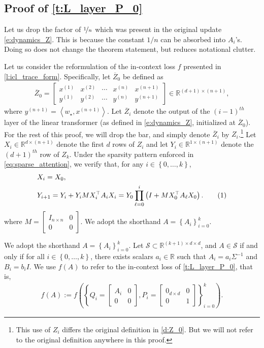 \documentclass{article}
\newcommand{\R}{\mathbb{R}}
\renewcommand{\S}{{\mathcal S}}
\newcommand{\wstar}{w_\star}
\newcommand{\tx}[1]{x^{(#1)}}
\newcommand{\ty}[1]{y^{(#1)}}
\newcommand*\lin[1]{\left\langle #1 \right\rangle}
\newcommand*\lrp[1]{\left( #1 \right)}
\newcommand*\lrbb[1]{\left\{ #1 \right\}}
\newcommand\numberthis{\addtocounter{equation}{1}\tag{\theequation}}
\begin{document}
\subsection{Proof of \autoref{t:L_layer_P_0}}
\label{sec:pf:t:L_layer_P_0}

Let us drop the factor of $\nicefrac{1}{n}$ which was present in the original update \eqref{e:dynamics_Z}. This is because the constant $1/n$ can be absorbed into $A_i$'s. Doing so does not change the theorem statement, but reduces notational clutter.

Let us consider the reformulation of the in-context loss $f$ presented in \autoref{l:icl_trace_form}. Specifically, let $\overline{Z}_0$ be defined as 
\begin{align*}
\overline{Z}_0 = \begin{bmatrix}
\tx{1} & \tx{2} & \cdots & \tx{n} &\tx{n+1} \\ 
\ty{1} & \ty{2} & \cdots &\ty{n}& \ty{n+1}
\end{bmatrix} \in \R^{(d+1) \times (n+1)},
\end{align*}
where $\ty{n+1} = \lin{\wstar, \tx{n+1}}$. Let $\overline{Z}_i$ denote the output of the $(i-1)^{th}$ layer of the linear transformer (as defined in \eqref{e:dynamics_Z}, initialized at $\overline{Z}_0$). For the rest of this proof, we will drop the bar, and simply denote $\overline{Z}_i$ by $Z_i$.\footnote{This use of $Z_i$ differs the original definition in \eqref{d:Z_0}. But we will not refer to the original definition anywhere in this proof.} Let $X_i\in \R^{d\times (n+1)}$ denote the first $d$ rows of $Z_i$ and let $Y_i\in \R^{1\times (n+1)}$ denote the $(d+1)^{th}$ row of $Z_k$. Under the sparsity pattern enforced in \eqref{eq:sparse_attention}, we verify that, for any $i \in \lrbb{0,\dots,k}$,
\begin{align*}
& X_i = X_0,\\
& Y_{i+1} =  Y_{i}  + Y_{i} M X_{i}^\top A_i X_{i} = Y_0 \prod_{\ell=0}^{i} \lrp{I + M X_0^\top A_\ell X_0}.
\numberthis \label{e:t:dynamic_Y_only}
\end{align*}
where $M = \begin{bmatrix}I_{n\times n} & 0 \\0 & 0\end{bmatrix}$. We adopt the shorthand $A = \lrbb{A_i}_{i=0}^k$.

We adopt the shorthand $A = \lrbb{A_i}_{i=0}^k$. Let $\S \subset \R^{(k+1) \times d \times d}$, and $A \in \S$ if and only if for all $i\in \lrbb{0,\dots,k}$, there exists scalars $a_i \in \R$ such that $A_i = a_i \Sigma^{-1}$ and $B_i = b_i I$. We use $f(A)$ to refer to the in-context loss of \autoref{t:L_layer_P_0}, that is,
\begin{align*}
f(A) := f \lrp{ \left\{ Q_i = \begin{bmatrix}
A_i & 0 \\ 
0 & 0
\end{bmatrix}, P_i = \begin{bmatrix}
0_{d\times d} & 0 \\ 
0 & 1 
\end{bmatrix}\right\}_{i=0}^k}.
\end{align*}
\end{document}
